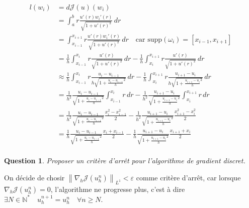 \documentclass{article}
\newcommand{\Integer}{ \mathbb{N} }
\newcommand{\Supp}[1]{\text{supp}\left( #1 \right)}
\newcommand{\FunctionWithSqrt}[1]{ \sqrt{1 + #1 ^2} }
\newcommand{\Norm}[2]{ \left\| #1 \right\|_{#2} }
\newcommand{\Integral}[4]{ \int_{#1}^{#2} #3 \, d#4 }
\newtheorem{question}{Question}[subsection]
\newenvironment{answer}
  {\color{blue}}
  {}
\newcommand{\QuestionAnswer}[2]{
    \begin{question}
        #1
    \end{question}
    \begin{answer}
        #2
    \end{answer}
}
\newcommand{\FunctionJ}{\mathcal{J}}
\begin{document}
{    \begin{align*}
        l(w_i) &= d\FunctionJ(u)(w_i) \\
        &= \Integral{a}{b}{ r \frac{u'(r)w_i'(r)}{\FunctionWithSqrt{u'(r)}} }{r} \\
        &= \Integral{x_{i-1}}{x_{i+1}}{ r \frac{u'(r)w_i'(r)}{\FunctionWithSqrt{u'(r)}} }{r} \quad \text{car } \Supp{\omega_i} = [x_{i-1},x_{i+1}] \\
        &= \frac{1}{h} \Integral{x_{i-1}}{x_{i}}{ r \frac{u'(r)}{\FunctionWithSqrt{u'(r)}} }{r} - \frac{1}{h} \Integral{x_{i}}{x_{i+1}}{ r \frac{u'(r)}{\FunctionWithSqrt{u'(r)}} }{r} \\
        &\approx \frac{1}{h} \Integral{x_{i-1}}{x_{i}}{ r \frac{u_{i} - u_{i-1}}{h \FunctionWithSqrt{\frac{u_{i} - u_{i-1}}{h}}} }{r} - \frac{1}{h} \Integral{x_{i}}{x_{i+1}}{ r \frac{u_{i+1} - u_{i}}{h \FunctionWithSqrt{\frac{u_{i+1} - u_{i}}{h}}} }{r} \\
        &= \frac{1}{h^2}\frac{u_{i} - u_{i-1}}{ \FunctionWithSqrt{\frac{u_{i} - u_{i-1}}{h}}} \Integral{x_{i-1}}{x_{i}}{ r }{r} - \frac{1}{h^2} \frac{u_{i+1} - u_{i}}{ \FunctionWithSqrt{\frac{u_{i+1} - u_{i}}{h}}} \Integral{x_{i}}{x_{i+1}}{ r }{r} \\
        &= \frac{1}{h^2}\frac{u_{i} - u_{i-1}}{ \FunctionWithSqrt{\frac{u_{i} - u_{i-1}}{h}}} \frac{x_{i}^2 - x_{i-1}^2}{2} - \frac{1}{h^2} \frac{u_{i+1} - u_{i}}{ \FunctionWithSqrt{\frac{u_{i+1} - u_{i}}{h}}} \frac{x_{i+1}^2 - x_{i}^2}{2} \\
        &= \frac{1}{h}\frac{u_{i} - u_{i-1}}{ \FunctionWithSqrt{\frac{u_{i} - u_{i-1}}{h}}} \frac{x_{i} + x_{i-1}}{2} - \frac{1}{h} \frac{u_{i+1} - u_{i}}{ \FunctionWithSqrt{\frac{u_{i+1} - u_{i}}{h}}} \frac{x_{i+1} + x_{i}}{2} \\
    \end{align*}

}

\QuestionAnswer{
    Proposer un critère d'arrêt pour l'algorithme de gradient discret.
}{
    On décide de chosir $\Norm{\nabla_h\FunctionJ(u^n_h)}{L^1} < \varepsilon$ comme critère d'arrêt, car lorsque $\nabla_h\FunctionJ(u^n_h) = 0$, l'algorithme ne progresse plus, c'est à dire $\exists N \in \Integer^* \quad u^{n+1}_h = u^n_h \quad \forall n \geq N$.
}
\end{document}

